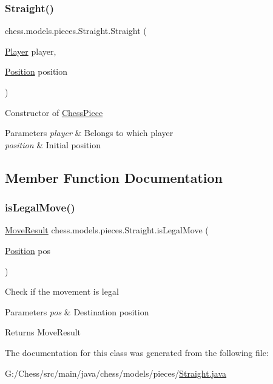 \subsubsection{\texorpdfstring{Straight()}{Straight()}}
{\footnotesize\ttfamily chess.\+models.\+pieces.\+Straight.\+Straight (\begin{DoxyParamCaption}\item[{\mbox{\hyperlink{enumchess_1_1models_1_1enums_1_1_player}{Player}}}]{player,  }\item[{\mbox{\hyperlink{classchess_1_1models_1_1_position}{Position}}}]{position }\end{DoxyParamCaption})}

Constructor of \mbox{\hyperlink{classchess_1_1models_1_1_chess_piece}{Chess\+Piece}}


\begin{DoxyParams}{Parameters}
{\em player} & Belongs to which player \\
\hline
{\em position} & Initial position \\
\hline
\end{DoxyParams}


\subsection{Member Function Documentation}
\mbox{\label{classchess_1_1models_1_1pieces_1_1_straight_a9c13a278d3270f9f8f28809f34e50e1f}} 
\subsubsection{\texorpdfstring{is\+Legal\+Move()}{isLegalMove()}}
{\footnotesize\ttfamily \mbox{\hyperlink{enumchess_1_1models_1_1enums_1_1_move_result}{Move\+Result}} chess.\+models.\+pieces.\+Straight.\+is\+Legal\+Move (\begin{DoxyParamCaption}\item[{\mbox{\hyperlink{classchess_1_1models_1_1_position}{Position}}}]{pos }\end{DoxyParamCaption})}

Check if the movement is legal 
\begin{DoxyParams}{Parameters}
{\em pos} & Destination position \\
\hline
\end{DoxyParams}
\begin{DoxyReturn}{Returns}
Move\+Result 
\end{DoxyReturn}


The documentation for this class was generated from the following file\+:\begin{DoxyCompactItemize}
\item 
G\+:/\+Chess/src/main/java/chess/models/pieces/\mbox{\hyperlink{_straight_8java}{Straight.\+java}}\end{DoxyCompactItemize}
